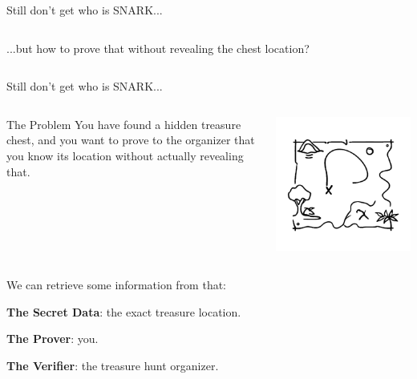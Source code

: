 \documentclass{zkdl-presentation-template}
\begin{document}
\begin{frame}{Still don't get who is SNARK...}
\begin{columns}
            \begin{column}{0.7\textwidth}
                ...but how to prove that without revealing the chest location?
            \end{column}
        \end{columns}
    \end{frame}

    \begin{frame}{Still don't get who is SNARK...}
        \begin{columns}
            \begin{column}{0.65\textwidth}
                \begin{block}{The Problem}
                You have found a hidden treasure chest, and you want to 
                prove to the organizer that you know its location without actually revealing that.
                \end{block}
            \end{column}

            \begin{column}{0.3\textwidth}
                \includegraphics[width=\textwidth]{../presentations/images/lecture_8/treasurelocation.png}
            \end{column}
        \end{columns}

        \pause

        We can retrieve some information from that:

        \vspace{0.1cm}
        \textbf{The Secret Data}: the exact treasure location.

        \vspace{0.1cm}
        \textbf{The Prover}: you.

        \vspace{0.1cm}
        \textbf{The Verifier}: the treasure hunt organizer.
    \end{frame}
\end{document}
